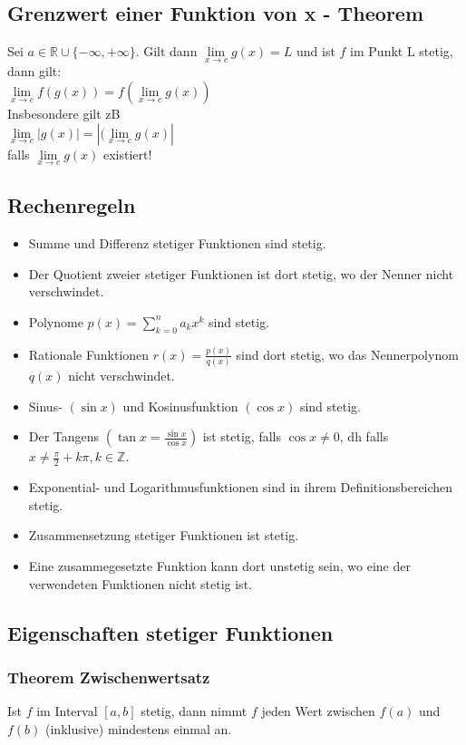 \documentclass[../main.tex]{subfiles}
\begin{document}
\subsection{Grenzwert einer Funktion von x - Theorem}
Sei $a \in \mathbb{R} \cup \{ -\infty, +\infty\}$. Gilt dann $\lim\limits_{x\to c} g(x)=L$ und ist $f$ im Punkt L stetig, dann gilt: \\ [7pt]
$\lim\limits_{x\to c} f(g(x)) = f(\lim\limits_{x\to c} g(x))$ \\ [7pt]
Insbesondere gilt zB \\ [7pt]
$\lim\limits_{x\to c} |g(x)| = |(\lim\limits_{x\to c} g(x)|$ \\ [7pt]
falls $\lim\limits_{x\to c} g(x)$ existiert!

\subsection{Rechenregeln}
\begin{itemize}
    \item Summe und Differenz stetiger Funktionen sind stetig.
    \item Der Quotient zweier stetiger Funktionen ist dort stetig, wo der Nenner nicht verschwindet.
    \item Polynome $p(x) = \sum\limits_{k=0}^n a_kx^k$ sind stetig.
    \item Rationale Funktionen $r(x) = \frac{p(x)}{q(x)}$ sind dort stetig, wo das Nennerpolynom $q(x)$ nicht verschwindet.
    \item Sinus- $(\sin x)$ und Kosinusfunktion $(\cos x)$ sind stetig.
    \item Der Tangens $(\tan x = \frac{\sin x}{\cos x})$ ist stetig, falls $\cos x \neq 0$, dh falls $x \neq \frac{\pi}{2} + k \pi, k \in \mathbb{Z}$.
    \item Exponential- und Logarithmusfunktionen sind in ihrem Definitionsbereichen stetig.
    \item Zusammensetzung stetiger Funktionen ist stetig.
    \item Eine zusammegesetzte Funktion kann dort unstetig sein, wo eine der verwendeten Funktionen nicht stetig ist.
\end{itemize}

\subsection{Eigenschaften stetiger Funktionen}
\subsubsection{Theorem Zwischenwertsatz}
Ist $f$ im Interval $[a,b]$ stetig, dann nimmt $f$ jeden Wert zwischen $f(a)$ und $f(b)$ (inklusive) mindestens einmal an.
\end{document}
